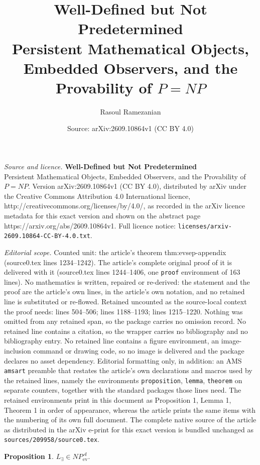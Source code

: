 \documentclass[10pt,a4paper]{amsart}
\title{\textbf{Well-Defined but Not Predetermined}\\ \large Persistent Mathematical Objects, Embedded Observers, and the Provability of \(P=NP\)}
\author{Rasoul Ramezanian}
\date{Source: arXiv:2609.10864v1 (CC BY 4.0)}
\newtheorem{proposition}{Proposition}
\newcommand{\Aev}{\mathcal A}
\begin{document}
\maketitle

\noindent\emph{Source and licence.} \textbf{Well-Defined but Not Predetermined}\\ \large Persistent Mathematical Objects, Embedded Observers, and the Provability of \(P=NP\). Version arXiv:2609.10864v1 (CC BY 4.0), distributed by arXiv under the Creative Commons Attribution 4.0 International licence, http://creativecommons.org/licenses/by/4.0/, as recorded in the arXiv licence metadata for this exact version and shown on the abstract page https://arxiv.org/abs/2609.10864v1. Full licence notice: \texttt{licenses/arxiv-2609.10864-CC-BY-4.0.txt}.\par\smallskip

\noindent\textit{Editorial scope.} Counted unit: the article's theorem thm:evsep-appendix (source0.tex lines 1234--1242). The article's complete original proof of it is delivered with it (source0.tex lines 1244--1406, one \texttt{proof} environment of 163 lines). No mathematics is written, repaired or re-derived: the statement and the proof are the article's own lines, in the article's own notation, and no retained line is substituted or re-flowed.  Retained uncounted as the source-local context the proof needs: lines 504--506; lines 1188--1193; lines 1215--1220.  Nothing was omitted from any retained span, so the package carries no omission record.  No retained line contains a citation, so the wrapper carries no bibliography and no bibliography entry.  No retained line contains a figure environment, an image-inclusion command or drawing code, so no image is delivered and the package declares no asset dependency.  Editorial formatting only, in addition: an AMS \texttt{amsart} preamble that restates the article's own declarations and macros used by the retained lines, namely the environments \texttt{proposition}, \texttt{lemma}, \texttt{theorem} on separate counters, together with the standard packages those lines need.  The retained environments print in this document as Proposition 1, Lemma 1, Theorem 1 in order of appearance, whereas the article prints the same items with the numbering of its own full document.  The complete native source of the article as distributed in the arXiv e-print for this exact version is bundled unchanged as \texttt{sources/209958/source0.tex}.
\begin{proposition}\label{prop:belongtoNP}
\(L_{\exists}\in NP_{\mathrm{ev}}^{\Aev}\).
\end{proposition}
\end{document}
